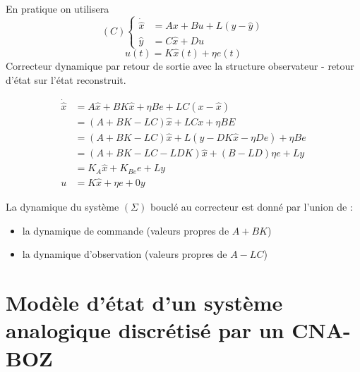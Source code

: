 \documentclass[main.tex]{subfiles}
\begin{document}
En pratique on utilisera
\[
(C) \left\{
\begin{array}{ll}
\dot{\hat{x}} &= Ax + Bu + L(y-\hat{y})\\
\hat{y} & = C\hat{x}+Du
\end{array}
\right.
\]
\[u(t) = K\hat{x}(t) + \eta e(t)\]
Correcteur dynamique par retour de sortie avec la structure observateur - retour d'état sur l'état reconstruit.

\begin{align*}
\dot{\hat{x}} & = A\hat{x} + BK\hat{x} + \eta Be + LC(x-\hat{x}) \\
& = (A+BK-LC)\hat{x} + LCx + \eta BE \\
& = (A+BK-LC)\hat{x} + L(y-DK\hat{x}-\eta De) + \eta Be \\
& = (A+BK-LC-LDK)\hat{x} + (B-LD)\eta e + Ly \\
& = K_A\hat{x} + K_{Be} e + Ly \\
u & = K\hat{x} + \eta e + 0y
\end{align*}

\begin{prop}
La dynamique du système $(\Sigma)$ bouclé au correcteur est donné par l'union de :
\begin{itemize}
\item la dynamique de commande (valeurs propres de $A+BK$)
\item la dynamique d'observation (valeurs propres de $A-LC$)
\end{itemize}
\end{prop}

\newpage
\section{Modèle d'état d'un système analogique discrétisé par un CNA-BOZ}
\begin{center}
\end{center}
\end{document}
